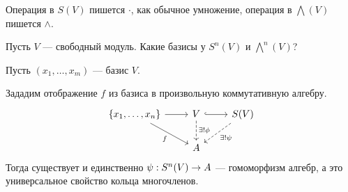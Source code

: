 
Операция в $S(V)$ пишется $\cdot$, как обычное умножение, операция в $\bigwedge(V)$ пишется $\wedge$.

\ok
Пусть $V$ --- свободный модуль.
Какие базисы у $S^n(V)$ и $\bigwedge^n(V)$?

Пусть $(x_1, \dots, x_m)$ --- базис $V$.

Зададим отображение $f$ из базиса в произвольную коммутативную алгебру.
\[\begin{tikzcd}[ampersand replacement=\&]
{\{x_1, \dots, x_n\}}
      \& V \& {S(V)} \\
      \& A
      \arrow["{\exists ! \phi}", dashed, from=1-2, to=2-2]
      \arrow["{\exists ! \psi}", dashed, from=1-3, to=2-2]
      \arrow["f"', from=1-1, to=2-2]
      \arrow[from=1-1, to=1-2]
      \arrow[hook, from=1-2, to=1-3]
\end{tikzcd}\]
Тогда существует и единственно $\psi: S^n(V) \rightarrow A$ --- гомоморфизм алгебр, а это универсальное свойство кольца многочленов.\label{s_is_poly}

